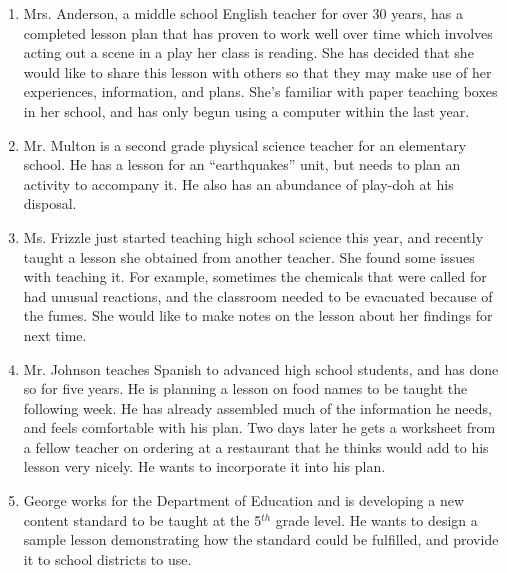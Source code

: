 \begin{enumerate}
\item Mrs. Anderson, a middle school English teacher for over 30 years, has a
completed lesson plan that has proven to work well over time which involves
acting out a scene in a play her class is reading. She has decided that she
would like to share this lesson with others so that they may make use of her
experiences, information, and plans.  She's familiar with paper teaching boxes
in her school, and has only begun using a computer within the last year.

\item Mr.  Multon is a second grade physical science teacher for an elementary
school. He has a lesson for an ``earthquakes'' unit, but needs to plan an
activity to accompany it.  He also has an abundance of play-doh at his disposal.

\item Ms. Frizzle just started teaching high school science this year,
and recently taught a lesson she obtained from another teacher. She found some
issues with teaching it.  For example, sometimes the chemicals that were called
for had unusual reactions, and the classroom needed to be evacuated because of
the fumes.  She would like to make notes on the lesson about her findings for
next time.

\item Mr. Johnson teaches Spanish to advanced high school students, and has done
so for five years. He is planning a lesson on food names to be taught the
following week. He has already assembled much of the information he needs, and
feels comfortable with his plan.  Two days later he gets a worksheet from a
fellow teacher on ordering at a restaurant that he thinks would add to his
lesson very nicely. He wants to incorporate it into his plan.

\item George works for the Department of Education and is developing a new
content standard to be taught at the 5$^{th}$ grade level. He wants to design a
sample lesson demonstrating how the standard could be fulfilled, and provide it
to school districts to use.

\end{enumerate}

